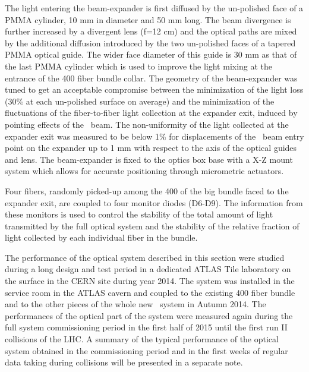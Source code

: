 The light entering the beam-expander is first diffused by the un-polished face of a
PMMA cylinder, 10 mm in diameter and 50 mm long. The beam divergence is further
increased by a divergent lens (f=12 cm) and the optical paths are mixed by the
additional diffusion introduced by the two un-polished faces of a tapered PMMA
optical guide. The wider face diameter of this guide is 30 mm as that of the last
PMMA cylinder which is used to improve the light mixing at
the entrance of the 400 fiber bundle collar. The geometry of the beam-expander was
tuned to get an acceptable compromise between the minimization
of the light loss (30$\%$ at each un-polished surface on average) and the
minimization of the fluctuations of the fiber-to-fiber light collection at the
expander exit, induced by pointing effects of the \laser~beam. The non-uniformity of
the light collected at the expander exit was measured to be below 1$\%$ for
displacements of the \laser~beam entry point on the expander up to 1 mm with respect
to the axis of the optical guides and lens. The beam-expander is fixed to the optics
box base with a X-Z mount system which allows for accurate positioning through
micrometric actuators.

Four fibers, randomly picked-up among the 400 of the big bundle faced to the
expander exit, are coupled to four monitor diodes (D6-D9). The information from
these monitors is used to control the stability of the total amount of light
transmitted by the full optical system and the stability of the relative fraction of
light collected by each individual fiber in the bundle.

The performance of the optical system described in this section were studied during
a long design and test period in a dedicated ATLAS Tile laboratory on the surface in
the CERN site during year 2014. The system was installed in the service room in the
ATLAS cavern and coupled to the existing 400 fiber bundle and to the other pieces of
the whole new \lasii~system in Autumn 2014. The performances of the optical
part of the system were measured again during the full system commissioning period
in the first half of 2015 until the first run II collisions of the LHC. A summary of
the typical performance of the optical system obtained in the commissioning period
and in the first weeks of regular data taking during collisions will be presented in a separate note.

